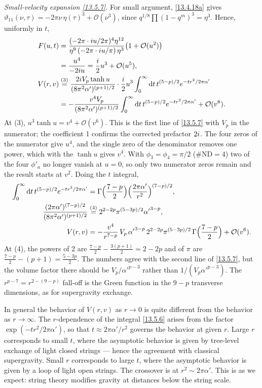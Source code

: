 \begin{tcolorbox}[breakable]
\begin{remark}
		\textit{Small-velocity expansion \eqref{13.5.7}.} For small argument, \eqref{13.4.18a} gives $\vartheta_{11}(\nu,\tau)=-2\pi\nu\,\eta(\tau)^3+\mathcal O(\nu^3)$, since $q^{1/8}\prod(1-q^m)^3=\eta^3$. Hence, uniformly in $t$,
		\begin{align*}
			F(u,t) &= \frac{(-2\pi\cdot i u/2\pi)^4\eta^{12}}{\eta^9\,(-2\pi\cdot i u/\pi)\,\eta^3}\bigl(1+\mathcal O(u^2)\bigr)\\ &= \frac{u^4}{-2i u} = \frac{i}{2}u^3+\mathcal O(u^5),\\
			V(r,v) &\overset{(3)}{=} \frac{2i V_p\tanh u}{(8\pi^2\alpha')^{(p+1)/2}}\cdot\frac{i}{2}u^3\int_0^\infty\mathrm{d} t\,t^{(5-p)/2}e^{-tr^2/2\pi\alpha'}\\ &= -\frac{v^4V_p}{(8\pi^2\alpha')^{(p+1)/2}}\int_0^\infty\mathrm{d} t\,t^{(5-p)/2}e^{-tr^2/2\pi\alpha'}+\mathcal O(v^6).
		\end{align*}
		At (3), $u^3\tanh u=v^4+\mathcal O(v^6)$. This is the first line of \eqref{13.5.7} with $V_p$ in the numerator; the coefficient 1 confirms the corrected prefactor $2i$. The four zeros of the numerator give $u^4$, and the single zero of the denominator removes one power, which with the $\tanh u$ gives $v^4$. With $\phi_3=\phi_4=\pi/2$ ($\#\mathrm{ND}=4$) two of the four $\phi'_a$ no longer vanish at $u=0$, so only two numerator zeros remain and the result starts at $v^2$. Doing the $t$ integral,
		\begin{align*}
			\int_0^\infty\mathrm{d} t\,t^{(5-p)/2}e^{-tr^2/2\pi\alpha'} &= \Gamma\Bigl(\frac{7-p}{2}\Bigr)\Bigl(\frac{2\pi\alpha'}{r^2}\Bigr)^{(7-p)/2},\\
			\frac{(2\pi\alpha')^{(7-p)/2}}{(8\pi^2\alpha')^{(p+1)/2}} &\overset{(4)}{=} 2^{2-2p}\pi^{(5-3p)/2}{\alpha'}^{3-p},\\
			V(r,v) &= -\frac{v^4}{r^{7-p}}\,V_p\,{\alpha'}^{3-p}\,2^{2-2p}\pi^{(5-3p)/2}\,\Gamma\Bigl(\frac{7-p}{2}\Bigr)+\mathcal O(v^6).
		\end{align*}
		At (4), the powers of 2 are $\frac{7-p}{2}-\frac{3(p+1)}{2}=2-2p$ and of $\pi$ are $\frac{7-p}{2}-(p+1)=\frac{5-3p}{2}$. The numbers agree with the second line of \eqref{13.5.7}, but the volume factor there should be $V_p/\alpha'^{p-3}$ rather than $1/(V_p\alpha'^{p-3})$. The $r^{p-7}=r^{2-(9-p)}$ fall-off is the Green function in the $9-p$ transverse dimensions, as for supergravity exchange.
	\end{remark}
\end{tcolorbox}

In general the behavior of $V(r,v)$ as $r \to 0$ is quite different from the behavior as $r \to \infty$. The $r$-dependence of the integral \eqref{13.5.6} arises from the factor $\exp(-t r^2/2\pi\alpha')$, so that $t \approx 2\pi\alpha'/r^2$ governs the behavior at given $r$. Large $r$ corresponds to small $t$, where the asymptotic behavior is given by tree-level exchange of light closed strings --- hence the agreement with classical supergravity. Small $r$ corresponds to large $t$, where the asymptotic behavior is given by a loop of light open strings. The crossover is at $r^2 \sim 2\pi\alpha'$. This is as we expect: string theory modifies gravity at distances below the string scale.

